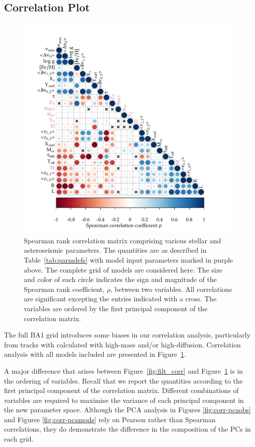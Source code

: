\subsection{Correlation Plot} 
\label{sec:fullcorr}

\begin{figure}
    \centering
    \includegraphics[trim={1cm 0 2cm 1cm},clip,
    width=\textwidth]{corr-spearman.pdf}
    \caption[]{Spearman rank correlation matrix comprising various stellar and asteroseismic parameters. The quantities are as described in Table~\ref{tab:parmdefs}
    with model input parameters marked in purple above. The complete grid of models are considered here. The size and color of each circle indicates the sign and magnitude of the Spearman rank coefficient, $\rho$, between two variables.  All correlations are significant excepting the entries indicated with a cross. The variables are ordered by the first principal component of the correlation matrix. }
    \label{fig:corr}
\end{figure}

The full BA1 grid introduces some biases in our correlation analysis, particularly from tracks with calculated with  high-mass and/or high-diffusion. Correlation analysis with all models included are presented in Figure~\ref{fig:corr}. 

A major difference that arises between Figure~\ref{fig:filt_corr} and Figure~\ref{fig:corr} is in the ordering of variables. Recall that we report the quantities according to the first principal component of the correlation matrix. Different combinations of variables are required to maximise the variance of each principal component in the new parameter space. Although the PCA analysis in Figures \ref{fig:corr-pcaobs} and Figures \ref{fig:corr-pcamods} rely on Pearson rather than Spearman correlations, they do demonstrate the difference in the composition of the PCs in each grid. 

